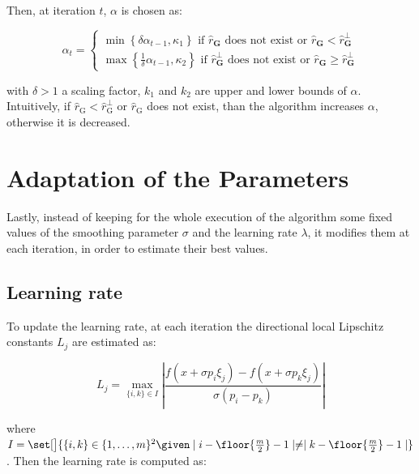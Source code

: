 Then, at iteration $t$, $\alpha$ is chosen as:

\begin{equation}\label{adapt alpha}
	\alpha_{t}=\left\{\begin{array}{ll}\min \left\{\delta \alpha_{t-1}, \kappa_{1}\right\} \text { if } \widehat{r}_{\mathbf{G}} \text { does not exist or } \widehat{r}_{\mathbf{G}}<\widehat{r}_{\mathbf{G}}^{\perp} \\ \max \left\{\frac{1}{\delta} \alpha_{t-1}, \kappa_{2}\right\} \text { if } \widehat{r}_{\mathbf{G}}^{\perp} \text { does not exist or } \widehat{r}_{\mathbf{G}} \geq \widehat{r}_{\mathbf{G}}^{\perp}\end{array}\right. 
\end{equation}

with $\delta > 1$ a scaling factor, $k_1$ and $k_2$ are upper and lower bounds of $\alpha$. Intuitively, if $\widehat{r}_{\mathrm{G}}<\widehat{r}_{\mathrm{G}}^{\perp} $ or $\widehat{r}_{\mathrm{G}}$ does not exist, than the algorithm increases $\alpha$, otherwise it is decreased.


\section{Adaptation of the Parameters}\label{sect:2_3} 

Lastly, instead of keeping for the whole execution of the algorithm some fixed values of the smoothing parameter $\sigma$ and the learning rate $\lambda$, it modifies them at each iteration, in order to estimate their best values.

\subsection{Learning rate}

To update the learning rate, at each iteration the directional local Lipschitz constants $L_j$ are estimated as:

\begin{equation}\label{Lipschitz constants}
	L_{j}=\max _{\{i,k\}\in I}\left|\frac{f\left(x+\sigma p_{i} \xi_{j}\right)-f\left(x+\sigma p_{k} \xi_{j}\right)}{\sigma\left(p_{i}-p_{k}\right)}\right| 
\end{equation}

where $I=\set[\big]{ \{ i,k \} \in \{1,\dots,m \}^2 \given \mid i-\floor{\frac{m}{2}} -1\mid \neq \mid k-\floor{\frac{m}{2}} -1\mid }$. Then the learning rate is computed as:

